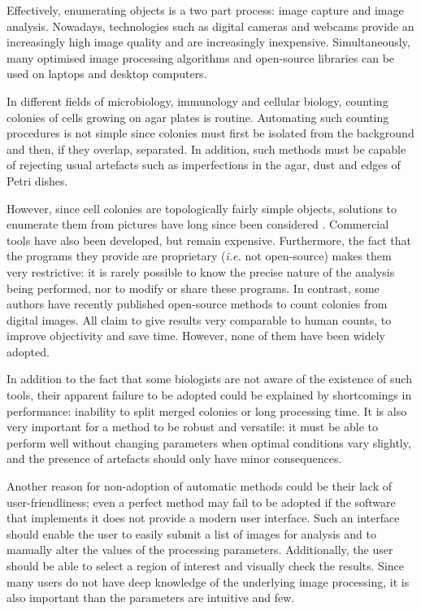 \documentclass[10pt]{article}
\begin{document}
Effectively, enumerating objects is a two part process: image capture and image
analysis. Nowadays, technologies such as digital cameras and webcams provide
an increasingly high image quality and are increasingly inexpensive.
Simultaneously, many optimised image processing
algorithms and open-source libraries can be used on laptops
and desktop computers.

In different fields of microbiology, immunology and cellular biology, counting
colonies of cells growing on agar plates is routine.
Automating such counting procedures is not simple since colonies must first be isolated
from the background and then, if they overlap, separated. In addition, such methods must be capable of rejecting usual artefacts
such as imperfections in the agar, dust and edges of Petri dishes.

However, since cell colonies are topologically fairly simple objects, solutions to
enumerate them from pictures have long since been considered
\cite{mansberg_automatic_1957,mukherjee_bacterial_1995}. Commercial tools have
also been developed\cite{putman_simplified_2005}, but remain expensive.
Furthermore, the fact that the programs they provide are proprietary 
(\emph{i.e.} not open-source) makes them very restrictive: it is rarely possible
to know the precise nature of the analysis being performed, nor to modify or
share these programs.
In contrast, some authors have recently published open-source methods to count
colonies from digital
images\cite{cai_optimized_2011,bewes_automated_2008,niyazi_counting_2007,clarke_lowcost_2010,sieuwerts_simple_2008,vokes_using_2008}.
All claim to give results very comparable to human counts, to improve
objectivity and save time. However, none of them have been widely adopted. 


In addition to the fact that some biologists are not aware of the existence of such
tools, their apparent failure to be adopted could be explained by shortcomings
in performance: inability to split merged colonies
or long processing time. It is also very important for a method to be robust and versatile:
it must be able to perform well without changing parameters when optimal conditions vary slightly,
and the presence of artefacts should only have minor consequences.


Another reason for non-adoption of automatic methods could be their lack of
user-friendliness; even a perfect method may fail to be adopted if the software
that implements it does not provide a modern user interface. Such an interface
should enable the user to easily submit a list of images for analysis and to
manually alter the values of the processing parameters. Additionally, the user
should be able to select a region of interest and visually check the results.
Since many users do not have deep knowledge of the underlying image processing, 
it is also important than the parameters are intuitive and few.
\end{document}
